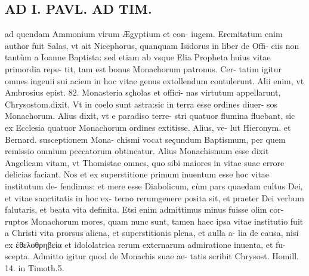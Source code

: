 \documentclass{article}
\begin{document}
\begin{pages}
\section*{AD I. PAVL. AD TIM. }
\marginpar{[ p.216 ]}\pstart ad quendam Ammonium virum Ægyptium et con- iugem. Eremitatum enim author fuit Salas, vt ait Nicephorus, quanquam Isidorus in liber  de Offi- ciis non tantùm a Ioanne Baptista: sed etiam ab vsque Elia Propheta huius vitae primordia repe- tit, tam est bonus Monachorum patronus. Cer- tatim igitur omnes ingenii sui aciem in hoc vitae genus extollendum contulerunt. Alii enim, vt Ambrosius epist. 82. Monasteria sçholas et offici- nas virtutum appellarunt, Chrysostom.dixit, Vt in coelo sunt astra:sic in terra esse ordines diuer- sos Monachorum. Alius dixit, vt e paradiso terre- stri quatuor flumina fluebant, sic ex Ecclesia quatuor Monachorum ordines extitisse. Alius, ve- lut Hieronym. et Bernard. susceptionem Mona- chismi vocat seçundum Baptismum, per quem remissio omnium peccatorum obtineatur. Alius Monachismum esse dixit Angelicam vitam, vt Thomistae omnes, quo sibi maiores in vitae suae errore delicias faciant. Nos et ex superstitione primum inuentum esse hoc vitae institutum de- fendimus: et mere esse Diabolicum, cùm pars quaedam cultus Dei, et vitae sanctitatis in hoc ex- terno rerumgenere posita sit, et praeter Dei verbum falutaris, et beata vita definita.  \pend\pstart Etsi enim admittimus minus fuisse olim cor- ruptos Monachorum mores, quam nunc sunt, tamen haec ipsa vitae institutio fuit a Christi vita prorsus aliena, et superstitionis plena, et aulla a- lia de causa, nisi ex ἐθελοθρηβεία et idololatrica rerum externarum admiratione inuenta, et fu- scepta. Admitto igitur quod de Monachis suae ae- tatis scribit Chrysost. Homill. 14. in Timoth.5.  \pend

\end{pages}
\end{document}
